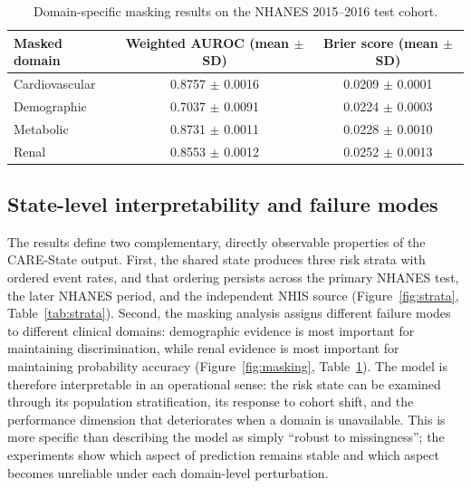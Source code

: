 \documentclass[12pt]{article}
\begin{document}
\begin{table}[t]
\centering
\caption{Domain-specific masking results on the NHANES 2015--2016 test cohort.}
\label{tab:masking}
\begin{tabular}{lcc}
\toprule
Masked domain & Weighted AUROC (mean $\pm$ SD) & Brier score (mean $\pm$ SD) \\
\midrule
Cardiovascular & 0.8757 $\pm$ 0.0016 & 0.0209 $\pm$ 0.0001 \\
Demographic & 0.7037 $\pm$ 0.0091 & 0.0224 $\pm$ 0.0003 \\
Metabolic & 0.8731 $\pm$ 0.0011 & 0.0228 $\pm$ 0.0010 \\
Renal & 0.8553 $\pm$ 0.0012 & 0.0252 $\pm$ 0.0013 \\
\bottomrule
\end{tabular}
\end{table}

\subsection{State-level interpretability and failure modes}
The results define two complementary, directly observable properties of the CARE-State output. First, the shared state produces three risk strata with ordered event rates, and that ordering persists across the primary NHANES test, the later NHANES period, and the independent NHIS source (Figure~\ref{fig:strata}, Table~\ref{tab:strata}). Second, the masking analysis assigns different failure modes to different clinical domains: demographic evidence is most important for maintaining discrimination, while renal evidence is most important for maintaining probability accuracy (Figure~\ref{fig:masking}, Table~\ref{tab:masking}). The model is therefore interpretable in an operational sense: the risk state can be examined through its population stratification, its response to cohort shift, and the performance dimension that deteriorates when a domain is unavailable. This is more specific than describing the model as simply ``robust to missingness''; the experiments show which aspect of prediction remains stable and which aspect becomes unreliable under each domain-level perturbation.
\end{document}
